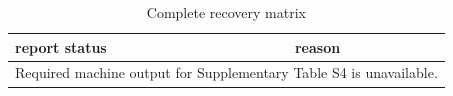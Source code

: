 \begin{table}[htbp]
\centering
\caption{Complete recovery matrix}
\label{tab:s4}
\begin{tabular}{ll}
\hline
report status & reason \\
\hline
\multicolumn{2}{l}{Required machine output for Supplementary Table S4 is unavailable.} \\
\hline
\end{tabular}
\end{table}
